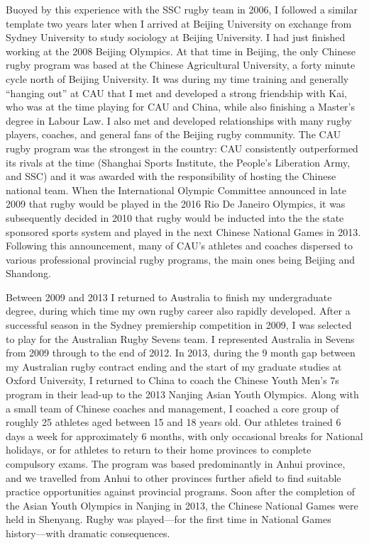 {  Buoyed by this experience with the SSC rugby team in 2006, I followed a similar template two years later when I arrived at Beijing University on exchange from Sydney University to study sociology at Beijing University.  I had just finished working at the 2008 Beijing Olympics. At that time in Beijing, the only Chinese rugby program was based at the Chinese Agricultural University, a forty minute cycle north of Beijing University.  It was during my time training and generally ``hanging out'' at CAU that I met and developed a strong friendship with Kai, who was at the time playing for CAU and China, while also finishing a Master's degree in Labour Law.  I also met and developed relationships with many rugby players, coaches, and general fans of the Beijing rugby community.  The CAU rugby program was the strongest in the country: CAU consistently outperformed its rivals at the time (Shanghai Sports Institute, the People's Liberation Army, and SSC) and it was awarded with the responsibility of hosting the Chinese national team.  When the International Olympic Committee announced in late 2009 that rugby would be played in the 2016 Rio De Janeiro Olympics, it was subsequently decided in 2010 that rugby would be inducted into the the state sponsored sports system and played in the next Chinese National Games in 2013.  Following this announcement, many of CAU's athletes and coaches dispersed to various professional provincial rugby programs, the main ones being Beijing and Shandong.

  Between 2009 and 2013 I returned to Australia to finish my undergraduate degree, during which time my own rugby career also rapidly developed.  After a successful season in the Sydney premiership competition in 2009, I was selected to play for the Australian Rugby Sevens team. I represented Australia in Sevens from 2009 through to the end of 2012.  In 2013, during the 9 month gap between my Australian rugby contract ending and the start of my graduate studies at Oxford University, I returned to China to coach the Chinese Youth Men's 7s program in their lead-up to the 2013 Nanjing Asian Youth Olympics.  Along with a small team of Chinese coaches and management, I coached a core group of roughly 25 athletes aged between 15 and 18 years old. Our athletes trained 6 days a week for approximately 6 months, with only occasional breaks for National holidays, or for athletes to return to their home provinces to complete compulsory exams.  The program was based predominantly in Anhui province, and we travelled from Anhui to other provinces further afield to find suitable practice opportunities against provincial programs.  Soon after the completion of the Asian Youth Olympics in Nanjing in 2013, the Chinese National Games were held in Shenyang. Rugby was played---for the first time in National Games history---with dramatic consequences.


}
